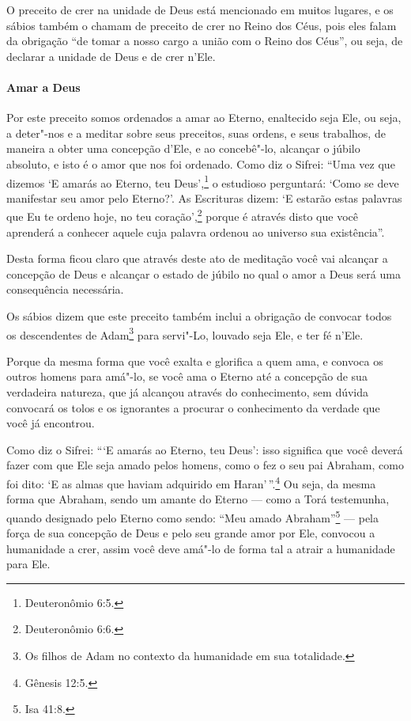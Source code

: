 \begin{multicols}{2}
O preceito de crer na unidade de Deus está mencionado em muitos lugares,
e os sábios também o chamam de preceito de crer no Reino dos Céus,
pois eles falam da obrigação ``de tomar a nosso cargo a união com o
Reino dos Céus'', ou seja, de declarar a unidade de Deus e de crer
n'Ele.

\paragraph{Amar a Deus}

Por este preceito somos ordenados a amar ao Eterno, enaltecido seja
Ele, ou seja, a deter"-nos e a meditar sobre seus preceitos, suas ordens,
e seus trabalhos, de maneira a obter uma concepção d'Ele, e ao
concebê"-lo, alcançar o júbilo absoluto, e isto é o amor que nos foi
ordenado. Como diz o Sifrei\starr: ``Uma vez que dizemos `E amarás ao Eterno,
teu Deus',\footnote{Deuteronômio 6:5.} o estudioso perguntará: `Como se deve
manifestar seu amor pelo Eterno?'. As Escrituras dizem: `E estarão
estas palavras que Eu te ordeno hoje, no teu coração',\footnote{Deuteronômio
6:6.} porque é através disto que você aprenderá a conhecer aquele cuja
palavra ordenou ao universo sua existência''.

Desta forma ficou claro que através deste ato de meditação você vai
alcançar a concepção de Deus e alcançar o estado de júbilo no qual o
amor a Deus será uma consequência necessária.

Os sábios dizem que este preceito também inclui a obrigação de convocar todos os descendentes de Adam\footnote{Os filhos de Adam no contexto da humanidade em sua totalidade.} para servi"-Lo, louvado seja Ele, e ter fé n'Ele. 

Porque da mesma forma que você exalta e glorifica a
quem ama, e convoca os outros homens para amá"-lo, se você ama o Eterno
até a concepção de sua verdadeira natureza, que já alcançou através do
conhecimento, sem dúvida convocará os tolos e os ignorantes a procurar
o conhecimento da verdade que você já encontrou.

Como diz o Sifrei\starr: ```E amarás ao Eterno, teu Deus': isso significa que
você deverá fazer com que Ele seja amado pelos homens, como o fez o seu
pai Abraham, como foi dito: `E as almas que haviam adquirido em Haran\starr'\,''.\footnote{Gênesis 12:5.} Ou seja, da mesma forma que Abraham, sendo um amante do Eterno --- como a Torá\starr{} testemunha, quando designado pelo Eterno como
sendo: ``Meu amado Abraham''\footnote{Isa 41:8.} --- pela força de sua
concepção de Deus e pelo seu grande amor por Ele, convocou a humanidade a crer, assim você deve amá"-lo de forma tal a atrair a humanidade para Ele.


\end{multicols}
